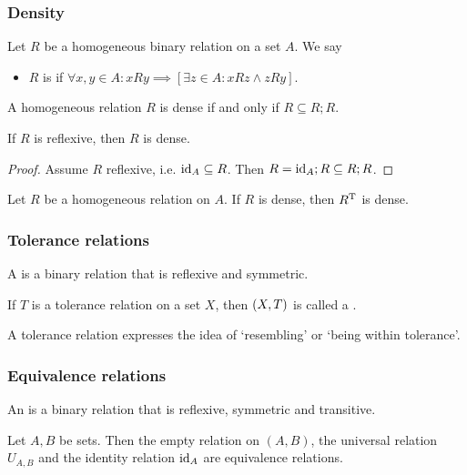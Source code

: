 \subsubsection{Density}
\begin{definition}
Let $R$ be a homogeneous binary relation on a set $A$. We say
\begin{itemize}
\item $R$ is  if $\forall x,y\in A: xRy \implies [\exists z\in A: xRz \land zRy]$.
\end{itemize}
\end{definition}

\begin{lemma}
A homogeneous relation $R$ is dense \textup{if and only if} $R \subseteq R;R$.
\end{lemma}
\begin{lemma}
If $R$ is reflexive, then $R$ is dense.
\end{lemma}
\begin{proof}
Assume $R$ reflexive, i.e. $\operatorname{id}_A\subseteq R$. Then $R = \operatorname{id}_A ;R \subseteq R;R$.
\end{proof}

\begin{lemma}
Let $R$ be a homogeneous relation on $A$. If $R$ is dense, then $R^{\mathrm{T}}$ is dense.
\end{lemma}

\subsubsection{Tolerance relations}
\begin{definition}
A  is a binary relation that is reflexive and symmetric.

If $T$ is a tolerance relation on a set $X$, then $\left( X,T \right)$ is called a .
\end{definition}
A tolerance relation expresses the idea of `resembling' or `being within tolerance'.


\subsubsection{Equivalence relations}
\begin{definition}
An  is a binary relation that is reflexive, symmetric and transitive.
\end{definition}

\begin{lemma}
Let $A,B$ be sets. Then the empty relation on $(A,B)$, the universal relation $U_{A,B}$ and the identity relation $\operatorname{id}_A$ are equivalence relations.
\end{lemma}

